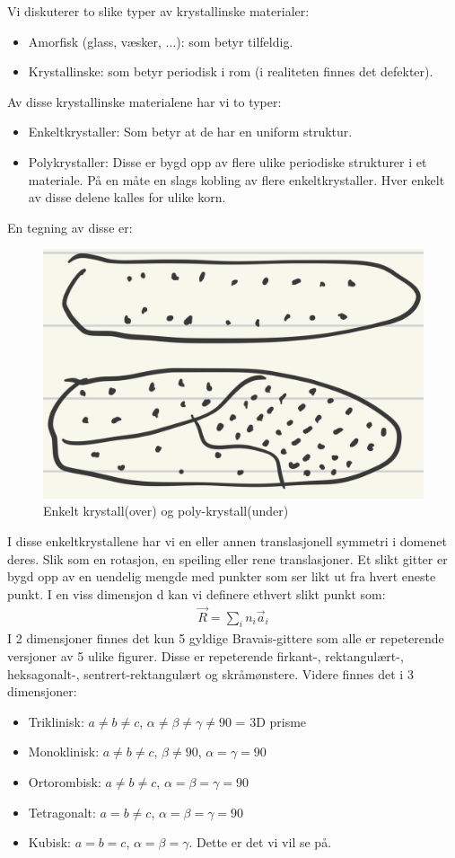 \documentclass{article}
\begin{document}
Vi diskuterer to slike typer av krystallinske materialer:
\begin{itemize}
    \item Amorfisk (glass, væsker, ...): som betyr tilfeldig.
    \item Krystallinske: som betyr periodisk i rom (i realiteten finnes det defekter).
\end{itemize}
Av disse krystallinske materialene har vi to typer:
\begin{itemize}
    \item Enkeltkrystaller: Som betyr at de har en uniform struktur.
    \item Polykrystaller: Disse er bygd opp av flere ulike periodiske strukturer i et materiale. På en måte en slags kobling av flere enkeltkrystaller. Hver enkelt av disse delene kalles for ulike korn. 
\end{itemize}
En tegning av disse er:
\begin{figure}[H]
    \centering
    \includegraphics[width=0.5\linewidth]{bilder/enkelt_poly_krystaller.png}
    \caption{Enkelt krystall(over) og poly-krystall(under)}
    \label{fig:enkelt_poly_krystaller}
\end{figure}
I disse enkeltkrystallene har vi en eller annen translasjonell symmetri i domenet deres. Slik som en rotasjon, en speiling eller rene translasjoner.
Et slikt gitter er bygd opp av en uendelig mengde med punkter som ser likt ut fra hvert eneste punkt. I en viss dimensjon d kan vi definere ethvert slikt punkt som:
\begin{align}
    \vec{R} = \sum_{i} n_i \vec{a}_i
\end{align}
I 2 dimensjoner finnes det kun 5 gyldige Bravais-gittere som alle er repeterende versjoner av 5 ulike figurer. Disse er repeterende firkant-, rektangulært-, heksagonalt-, sentrert-rektangulært og skråmønstere. Videre finnes det i 3 dimensjoner:
\begin{itemize}
    \item Triklinisk: $a\ne b\ne c$, $\alpha \ne \beta \ne \gamma \ne 90$ = 3D prisme
    \item Monoklinisk: $a \ne b \ne c$, $\beta \ne 90$, $\alpha = \gamma = 90$
    \item Ortorombisk: $a \ne b \ne c$, $\alpha = \beta = \gamma = 90$
    \item Tetragonalt: $a = b \ne c$, $\alpha = \beta = \gamma = 90$
    \item Kubisk: $a = b = c$, $\alpha = \beta = \gamma$. Dette er det vi vil se på.
\end{itemize}
\end{document}
